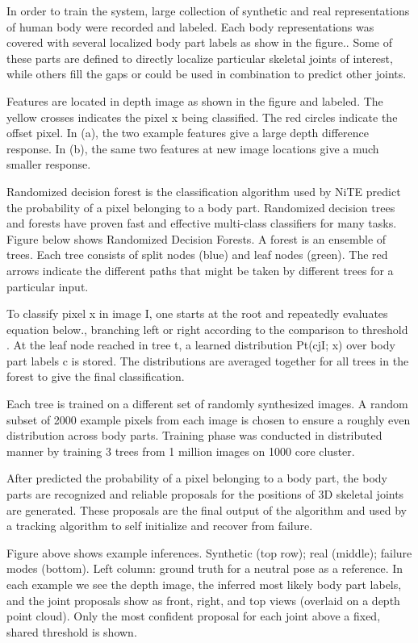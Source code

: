 In order to train the system, large collection of synthetic and real representations of human body were recorded and labeled. Each body representations was covered with several localized body part labels as show in the figure.. Some of these parts are defined to directly localize particular skeletal joints of interest, while others fill the gaps or could be used in combination to predict other joints.

Features are located in depth image as shown in the figure and labeled. The yellow crosses indicates the pixel x being classified. The red circles indicate the offset pixel. In (a), the two example features give a large depth difference response. In (b), the same two features at new image locations give a much smaller response.

Randomized decision forest is the classification algorithm used by NiTE predict the probability of  a pixel belonging to a body part. Randomized decision trees and forests have proven fast and effective multi-class classifiers for many tasks. Figure below shows Randomized Decision Forests. A forest is an ensemble of trees. Each tree consists of split nodes (blue) and leaf nodes (green). The red arrows indicate the different paths that might be taken by different trees for a particular input.

To classify pixel x in image I, one starts at the root and repeatedly evaluates equation below., branching left or right according to the comparison to threshold . At the leaf node reached in tree t, a learned distribution Pt(cjI; x) over body part labels c is stored. The distributions are averaged together for all trees in the forest to give the final classification.

Each tree is trained on a different set of randomly synthesized images. A random subset of 2000 example pixels from each image is chosen to ensure a roughly even distribution across body parts. Training phase was conducted in distributed manner by training 3 trees from 1 million images on 1000 core cluster.

After predicted the probability of a pixel belonging to a body part, the body parts are recognized and reliable proposals for the positions of 3D skeletal joints are generated. These proposals are the final output of the algorithm and used by a tracking algorithm to self initialize and recover from failure.

Figure above shows example inferences. Synthetic (top row); real (middle); failure modes (bottom). Left column: ground truth for a neutral pose as a reference. In each example we see the depth image, the inferred most likely body part labels, and the joint proposals show as front, right, and top views (overlaid on a depth point cloud). Only the most confident proposal for each joint above a fixed, shared threshold is shown.

